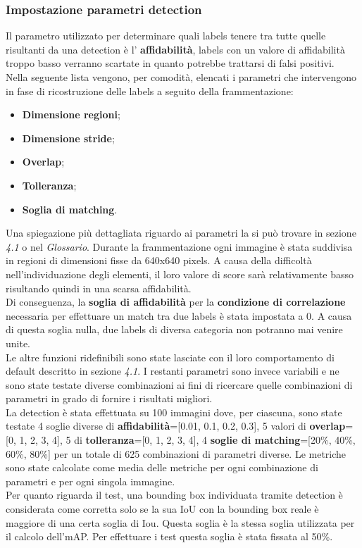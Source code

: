 \subsubsection{Impostazione parametri detection}
Il parametro utilizzato per determinare quali labels tenere tra tutte quelle risultanti da una detection è l' \textbf{affidabilità}, labels con un valore di affidabilità troppo basso verranno scartate in quanto potrebbe trattarsi di falsi positivi.\\
Nella seguente lista vengono, per comodità, elencati i parametri che intervengono in fase di ricostruzione delle labels a seguito della frammentazione:
\begin{itemize}
\item \textbf{Dimensione regioni};
\item \textbf{Dimensione stride};
\item \textbf{Overlap};
\item \textbf{Tolleranza};
\item \textbf{Soglia di matching}.
\end{itemize}
Una spiegazione più dettagliata riguardo ai parametri la si può trovare in sezione \textit{4.1} o nel \textit{Glossario}.
Durante la frammentazione ogni immagine è stata suddivisa in regioni di dimensioni fisse da 640x640 pixels. A causa della difficoltà nell'individuazione degli elementi, il loro valore di score sarà relativamente basso risultando quindi in una scarsa affidabilità.\\
Di conseguenza, la \textbf{soglia di affidabilità} per la \textbf{condizione di correlazione} necessaria per effettuare un match tra due labels è stata impostata a 0. A causa di questa soglia nulla, due labels di diversa categoria non potranno mai venire unite.\\
Le altre funzioni ridefinibili sono state lasciate con il loro comportamento di default descritto in sezione \textit{4.1}. I restanti parametri sono invece variabili e ne sono state testate diverse combinazioni ai fini di ricercare quelle combinazioni di parametri in grado di fornire i risultati migliori.\\
La detection è stata effettuata su 100 immagini dove, per ciascuna, sono state testate 4 soglie diverse di \textbf{affidabilità}=[0.01, 0.1, 0.2, 0.3], 5 valori di \textbf{overlap}=[0, 1, 2, 3, 4], 5 di \textbf{tolleranza}=[0, 1, 2, 3, 4], 4 \textbf{soglie di matching}=[20\%, 40\%, 60\%, 80\%] per un totale di 625 combinazioni di parametri diverse. Le metriche sono state calcolate come media delle metriche per ogni combinazione di parametri e per ogni singola immagine.\\
Per quanto riguarda il test, una bounding box individuata tramite detection è considerata come corretta solo se la sua IoU con la bounding box reale è maggiore di una certa soglia di Iou. Questa soglia è la stessa soglia utilizzata per il calcolo dell'mAP. Per effettuare i test questa soglia è stata fissata al 50\%.

